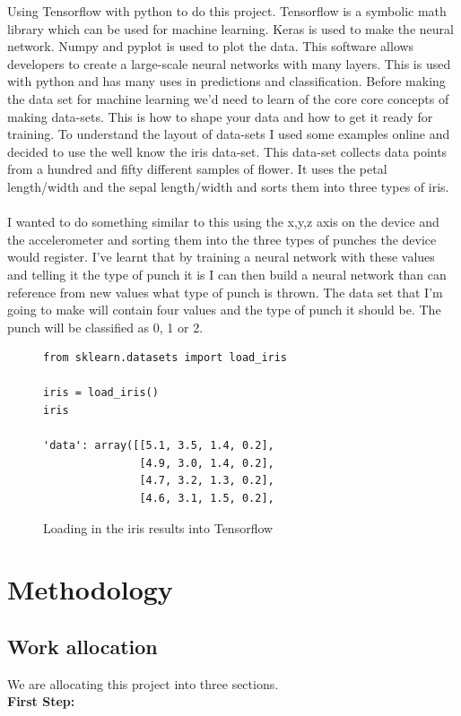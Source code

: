 \documentclass[a4paper,12pt]{report}
\begin{document}
Using Tensorflow with python to do this project. Tensorflow is a symbolic math library which can be used for machine learning. Keras is used to make the neural network. Numpy and pyplot is used to plot the data. This software allows developers to create a large-scale neural networks with many layers. This is used with python and has many uses in predictions and classification. Before making the data set for machine learning we'd need to learn of the core core concepts of making data-sets. This is how to shape your data and how to get it ready for training. To understand the layout of data-sets I used some examples online and decided to use the well know the iris data-set. This data-set collects data points from a hundred and fifty different samples of flower. It uses the petal length/width and the sepal length/width and sorts them into three types of iris.
\\
\\
I wanted to do something similar to this using the x,y,z axis on the device and the accelerometer and sorting them into the three types of punches the device would register. I've learnt that by training a neural network with these values and telling it the type of punch it is I can then build a neural network than can reference from new values what type of punch is thrown. The data set that I'm going to make will contain four values and the type of punch it should be. The punch will be classified as 0, 1 or 2.

\begin{figure}[h]
\begin{verbatim}
from sklearn.datasets import load_iris

iris = load_iris()
iris

'data': array([[5.1, 3.5, 1.4, 0.2],
               [4.9, 3.0, 1.4, 0.2],
               [4.7, 3.2, 1.3, 0.2],
               [4.6, 3.1, 1.5, 0.2],
\end{verbatim}
\caption{Loading in the iris results into Tensorflow}
\label{fig:iris}
\end{figure}

\chapter{Methodology}
\section{Work allocation}
We are allocating this project into three sections.\\
\textbf{First Step:}
\end{document}
